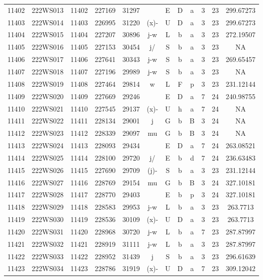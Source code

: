 \begin{tabular}{|*{12}{c|}}
11402 & 222WS013 & 11402 & 227169 & 31297 &  & E & D & a & 3 & 23 & 299.67273 \\ 
11403 & 222WS014 & 11403 & 226995 & 31220 & (x)- & U & D & a & 3 & 23 & 299.67273 \\ 
11404 & 222WS015 & 11404 & 227207 & 30896 & j-w & L & b & a & 3 & 23 & 272.19507 \\ 
11405 & 222WS016 & 11405 & 227153 & 30454 & j/ & S & b & a & 3 & 23 & NA \\ 
11406 & 222WS017 & 11406 & 227641 & 30343 & j-w & S & b & a & 3 & 23 & 269.65457 \\ 
11407 & 222WS018 & 11407 & 227196 & 29989 & j-w & S & b & a & 3 & 23 & NA \\ 
11408 & 222WS019 & 11408 & 227464 & 29814 & w & L & F & p & 3 & 23 & 231.12144 \\ 
11409 & 222WS020 & 11409 & 227669 & 29246 &  & E & D & a & 7 & 24 & 240.98755 \\ 
11410 & 222WS021 & 11410 & 227545 & 29137 & (x)- & U & h & a & 7 & 24 & NA \\ 
11411 & 222WS022 & 11411 & 228134 & 29001 & j & G & b & B & 3 & 24 & NA \\ 
11412 & 222WS023 & 11412 & 228339 & 29097 & mu & G & b & B & 3 & 24 & NA \\ 
11413 & 222WS024 & 11413 & 228093 & 29434 &  & E & D & a & 7 & 24 & 263.08521 \\ 
11414 & 222WS025 & 11414 & 228100 & 29720 & j/ & E & b & d & 7 & 24 & 236.63483 \\ 
11415 & 222WS026 & 11415 & 227690 & 29709 & (j)- & S & b & a & 3 & 23 & 231.12144 \\ 
11416 & 222WS027 & 11416 & 228769 & 29154 & mu & G & b & B & 3 & 24 & 327.10181 \\ 
11417 & 222WS028 & 11417 & 228770 & 29403 &  & E & b & p & 3 & 24 & 327.10181 \\ 
11418 & 222WS029 & 11418 & 228583 & 29953 & j-w & L & b & a & 3 & 23 & 263.7713 \\ 
11419 & 222WS030 & 11419 & 228536 & 30109 & (x)- & U & D & a & 3 & 23 & 263.7713 \\ 
11420 & 222WS031 & 11420 & 228968 & 30720 & j-w & L & b & a & 7 & 23 & 287.87997 \\ 
11421 & 222WS032 & 11421 & 228919 & 31111 & j-w & L & b & a & 3 & 23 & 287.87997 \\ 
11422 & 222WS033 & 11422 & 228952 & 31439 & j & S & b & a & 3 & 23 & 296.61639 \\ 
11423 & 222WS034 & 11423 & 228786 & 31919 & (x)- & U & D & a & 7 & 23 & 309.12042 \\ 

\end{tabular}
